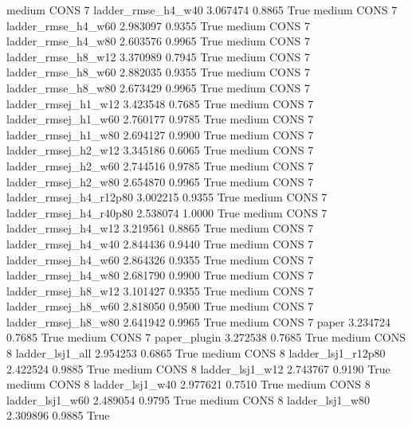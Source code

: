     medium     CONS                 7     ladder_rmse_h4_w40   3.067474      0.8865    True
    medium     CONS                 7     ladder_rmse_h4_w60   2.983097      0.9355    True
    medium     CONS                 7     ladder_rmse_h4_w80   2.603576      0.9965    True
    medium     CONS                 7     ladder_rmse_h8_w12   3.370989      0.7945    True
    medium     CONS                 7     ladder_rmse_h8_w60   2.882035      0.9355    True
    medium     CONS                 7     ladder_rmse_h8_w80   2.673429      0.9965    True
    medium     CONS                 7    ladder_rmsej_h1_w12   3.423548      0.7685    True
    medium     CONS                 7    ladder_rmsej_h1_w60   2.760177      0.9785    True
    medium     CONS                 7    ladder_rmsej_h1_w80   2.694127      0.9900    True
    medium     CONS                 7    ladder_rmsej_h2_w12   3.345186      0.6065    True
    medium     CONS                 7    ladder_rmsej_h2_w60   2.744516      0.9785    True
    medium     CONS                 7    ladder_rmsej_h2_w80   2.654870      0.9965    True
    medium     CONS                 7 ladder_rmsej_h4_r12p80   3.002215      0.9355    True
    medium     CONS                 7 ladder_rmsej_h4_r40p80   2.538074      1.0000    True
    medium     CONS                 7    ladder_rmsej_h4_w12   3.219561      0.8865    True
    medium     CONS                 7    ladder_rmsej_h4_w40   2.844436      0.9440    True
    medium     CONS                 7    ladder_rmsej_h4_w60   2.864326      0.9355    True
    medium     CONS                 7    ladder_rmsej_h4_w80   2.681790      0.9900    True
    medium     CONS                 7    ladder_rmsej_h8_w12   3.101427      0.9355    True
    medium     CONS                 7    ladder_rmsej_h8_w60   2.818050      0.9500    True
    medium     CONS                 7    ladder_rmsej_h8_w80   2.641942      0.9965    True
    medium     CONS                 7                  paper   3.234724      0.7685    True
    medium     CONS                 7           paper_plugin   3.272538      0.7685    True
    medium     CONS                 8        ladder_lsj1_all   2.954253      0.6865    True
    medium     CONS                 8     ladder_lsj1_r12p80   2.422524      0.9885    True
    medium     CONS                 8        ladder_lsj1_w12   2.743767      0.9190    True
    medium     CONS                 8        ladder_lsj1_w40   2.977621      0.7510    True
    medium     CONS                 8        ladder_lsj1_w60   2.489054      0.9795    True
    medium     CONS                 8        ladder_lsj1_w80   2.309896      0.9885    True

